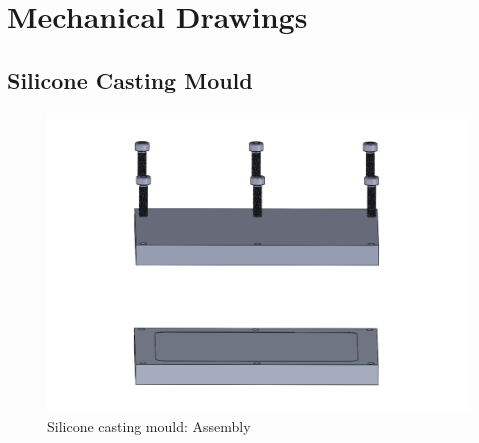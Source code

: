 \appendix
\chapter{Mechanical Drawings}
\label{appendix:aad}
\section{Silicone Casting Mould}

\begin{figure}[ht]%
\centering
\includegraphics[width=1\textwidth]{figures/appendix/siliconecastingmoldcropped}%
\caption{Silicone casting mould: Assembly}%
\label{siliconecastingmold}%
\end{figure}

\clearpage

